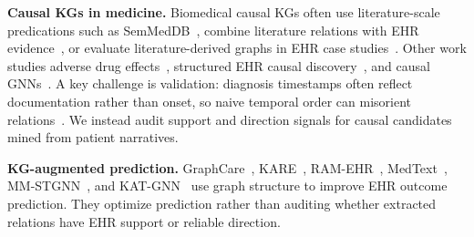 \documentclass[runningheads]{llncs}
\begin{document}
\noindent\textbf{Causal KGs in medicine.} Biomedical causal KGs often use literature-scale predications such as SemMedDB~\cite{kilicoglu2012semmeddb}, combine literature relations with EHR evidence~\cite{nordon2019building}, or evaluate literature-derived graphs in EHR case studies~\cite{lyu2023dnkg}. Other work studies adverse drug effects~\cite{ade2026causalkg}, structured EHR causal discovery~\cite{shen2021causaldiscovery}, and causal GNNs~\cite{causalgnn2025survey}. A key challenge is validation: diagnosis timestamps often reflect documentation rather than onset, so naive temporal order can misorient relations~\cite{shen2021causaldiscovery,doutreligne2024causal}. We instead audit support and direction signals for causal candidates mined from patient narratives.%

\noindent\textbf{KG-augmented prediction.} GraphCare~\cite{jiang2024graphcare}, KARE~\cite{kare2025}, RAM-EHR~\cite{xu2024ramehr}, MedText~\cite{lu2021medtext}, MM-STGNN~\cite{tang2023multimodal}, and KAT-GNN~\cite{katgnn2025} use graph structure to improve EHR outcome prediction. They optimize prediction rather than auditing whether extracted relations have EHR support or reliable direction.
\end{document}
